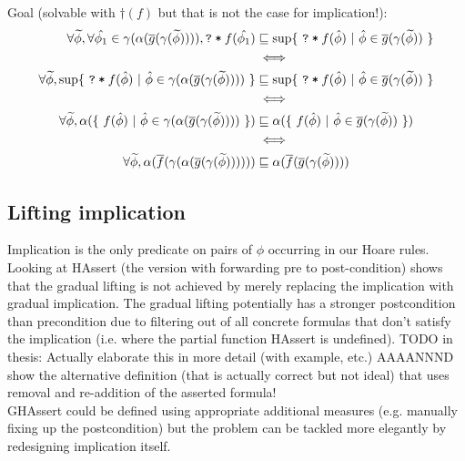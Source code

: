 \documentclass[11pt,a4paper]{article}
\begin{document}
Goal (solvable with $\dagger(f)$ but that is not the case for implication!):
\begin{align*}
\forall \widetilde{\phi}, 
\forall \hat{\phi_1} \in \gamma(\alpha(\overline{g}(\gamma(\widetilde{\phi})))), 
\texttt{\texttt{?}\:*\:$f(\hat{\phi_1})$} &\sqsubseteq 
\sup \{~ \texttt{\texttt{?}\:*\:$f(\hat{\phi})$} ~|~ \hat{\phi} \in \overline{g}(\gamma(\widetilde{\phi})) ~\}\\
&\iff \\
\forall \widetilde{\phi}, 
\sup \{~ \texttt{\texttt{?}\:*\:$f(\hat{\phi})$} ~|~ \hat{\phi} \in \gamma(\alpha(\overline{g}(\gamma(\widetilde{\phi})))) ~\} &\sqsubseteq 
\sup \{~ \texttt{\texttt{?}\:*\:$f(\hat{\phi})$} ~|~ \hat{\phi} \in \overline{g}(\gamma(\widetilde{\phi})) ~\}\\
&\iff \\
\forall \widetilde{\phi}, 
\alpha(\{~ f(\hat{\phi}) ~|~ \hat{\phi} \in \gamma(\alpha(\overline{g}(\gamma(\widetilde{\phi})))) ~\}) &\sqsubseteq
\alpha(\{~ f(\hat{\phi}) ~|~ \hat{\phi} \in \overline{g}(\gamma(\widetilde{\phi})) ~\})\\
&\iff \\
\forall \widetilde{\phi}, 
\alpha(\overline{f}(\gamma(\alpha(\overline{g}(\gamma(\widetilde{\phi})))))) &\sqsubseteq \alpha(\overline{f}(\overline{g}(\gamma(\widetilde{\phi}))))\\
\end{align*}


\subsection{Lifting implication}
Implication is the only predicate on pairs of $\phi$ occurring in our Hoare rules.\\

Looking at HAssert (the version with forwarding pre to post-condition) shows that the gradual lifting is not achieved by merely replacing the implication with gradual implication.
The gradual lifting potentially has a stronger postcondition than precondition due to filtering out of all concrete formulas that don't satisfy the implication (i.e. where the partial function HAssert is undefined).
TODO in thesis: Actually elaborate this in more detail (with example, etc.) AAAANNND show the alternative definition (that is actually correct but not ideal) that uses removal and re-addition of the asserted formula!\\

GHAssert could be defined using appropriate additional measures (e.g. manually fixing up the postcondition) but the problem can be tackled more elegantly by redesigning implication itself.\\
\end{document}
